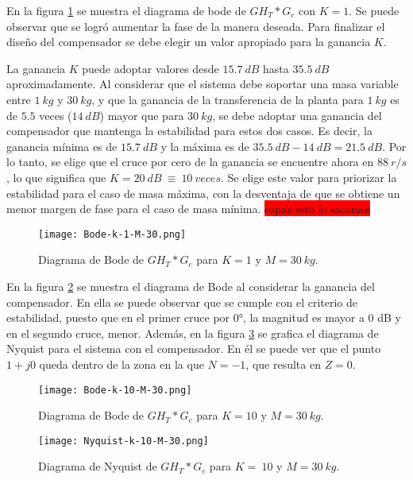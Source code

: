 \noindent En la figura \ref{fig:bode-analog-compensado-para-k-1} se muestra el diagrama de bode de ${GH}_T*G_c$ con $K=1$. Se puede observar que se logró aumentar la fase de la manera deseada. Para finalizar el diseño del compensador se debe elegir un valor apropiado para la ganancia $K$.

La ganancia $K$ puede adoptar valores desde $15.7\:dB$ hasta $35.5\:dB$ aproximadamente. Al considerar que el sistema debe soportar una masa variable entre $1\:kg$ y $30\:kg$, y que la ganancia de la transferencia de la planta para $1\:kg$ es de $5.5$ veces ($14\:dB$) mayor que para $30\:kg$, se debe adoptar una ganancia del compensador que mantenga la estabilidad para estos dos casos. Es decir, la ganancia mínima es de $15.7\:dB$ y la máxima es de $35.5\:dB - 14\:dB = 21.5\:dB$. Por lo tanto, se elige que el cruce por cero de la ganancia se encuentre ahora en $88\:r/s$, lo que significa que $K=20\:dB\ \equiv \ 10\: veces$. Se elige este valor para priorizar la estabilidad para el caso de masa máxima, con la desventaja de que se obtiene un menor margen de fase para el caso de masa mínima. \colorbox{red}{capaz esto lo sacamos}


\begin{figure}[H]
	\centering
	\texttt{[image: Bode-k-1-M-30.png]}
	\caption{Diagrama de Bode de $GH_T*G_c$ para $K=1$ y $M=30\:kg$.}
	\label{fig:bode-analog-compensado-para-k-1}
\end{figure}

\noindent En la figura \ref{fig:bode-analog-compensado-para-k-10} se muestra el diagrama de Bode al considerar la ganancia del compensador. En ella se puede observar que se  cumple con el criterio de estabilidad, puesto que en el primer cruce por 0°, la magnitud es mayor a 0 dB y en el segundo cruce, menor. Además, en la figura \ref{fig:nyquist-analog-para-k-10} se grafica el diagrama de Nyquist para el sistema con el compensador. En él se puede ver que el punto $1+j0$ queda dentro de la zona en la que $N=-1$, que resulta en $Z=0$.

\begin{figure}[H]
	\centering
	\texttt{[image: Bode-k-10-M-30.png]}
	\caption{Diagrama de Bode de $GH_{T}*G_c$ para $K=10$ y $M=30\:kg$.}
	\label{fig:bode-analog-compensado-para-k-10}
\end{figure}

\begin{figure}[H]
	\centering
	\texttt{[image: Nyquist-k-10-M-30.png]}
	\caption{Diagrama de Nyquist de $GH_T*G_c$ para $K=\:10$ y $M=30\:kg$.}
	\label{fig:nyquist-analog-para-k-10}
\end{figure}


